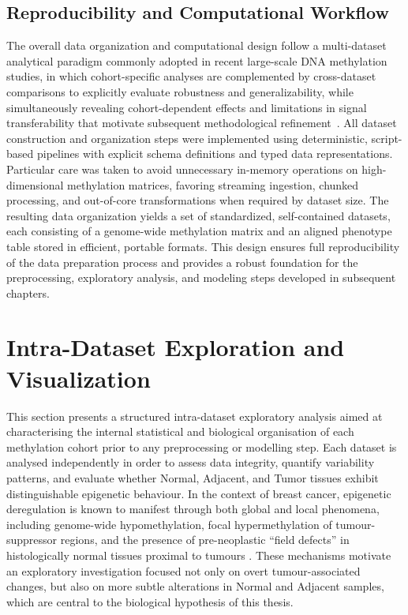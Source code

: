 \subsection{Reproducibility and Computational Workflow}

The overall data organization and computational design follow a multi-dataset analytical paradigm commonly adopted in recent large-scale DNA methylation studies, in which cohort-specific analyses are complemented by cross-dataset comparisons to explicitly evaluate robustness and generalizability, while simultaneously revealing cohort-dependent effects and limitations in signal transferability that motivate subsequent methodological refinement~\cite{Sokolov2024}.
All dataset construction and organization steps were implemented using deterministic, script-based pipelines with explicit schema definitions and typed data representations. Particular care was taken to avoid unnecessary in-memory operations on high-dimensional methylation matrices, favoring streaming ingestion, chunked processing, and out-of-core transformations when required by dataset size.
The resulting data organization yields a set of standardized, self-contained datasets, each consisting of a genome-wide methylation matrix and an aligned phenotype table stored in efficient, portable formats. This design ensures full reproducibility of the data preparation process and provides a robust foundation for the preprocessing, exploratory analysis, and modeling steps developed in subsequent chapters.

\section{Intra-Dataset Exploration and Visualization}
\label{sec:intra_dataset}

This section presents a structured intra-dataset exploratory analysis aimed at characterising the internal statistical and biological organisation of each methylation cohort prior to any preprocessing or modelling step. Each dataset is analysed independently in order to assess data integrity, quantify variability patterns, and evaluate whether Normal, Adjacent, and Tumor tissues exhibit distinguishable epigenetic behaviour.
In the context of breast cancer, epigenetic deregulation is known to manifest through both global and local phenomena, including genome-wide hypomethylation, focal hypermethylation of tumour-suppressor regions, and the presence of pre-neoplastic ``field defects'' in histologically normal tissues proximal to tumours \cite{ehrlich2002, bird2002, Teschendorff2016fielddefects}. These mechanisms motivate an exploratory investigation focused not only on overt tumour-associated changes, but also on more subtle alterations in Normal and Adjacent samples, which are central to the biological hypothesis of this thesis.

